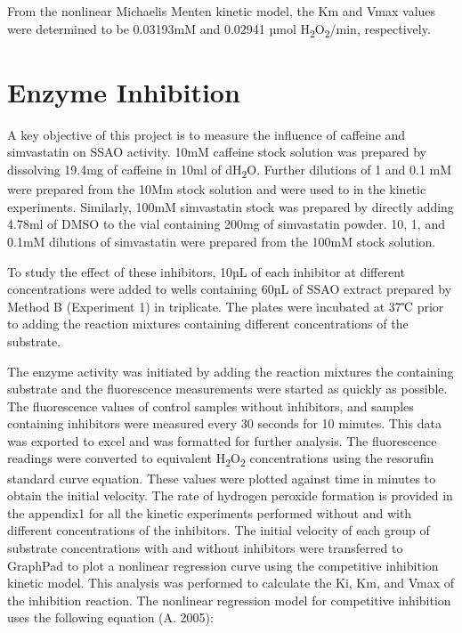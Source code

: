 \documentclass[
  letterpaper,
  DIV=11,
  numbers=noendperiod]{scrreprt}
\begin{document}
From the nonlinear Michaelis Menten kinetic model, the Km and Vmax
values were determined to be 0.03193mM and 0.02941 µmol
H\textsubscript{2}O\textsubscript{2}/min, respectively.

\section{\texorpdfstring{\textbf{Enzyme
Inhibition}}{Enzyme Inhibition}}\label{enzyme-inhibition}

A key objective of this project is to measure the influence of caffeine
and simvastatin on SSAO activity. 10mM caffeine stock solution was
prepared by dissolving 19.4mg of caffeine in 10ml of
dH\textsubscript{2}O. Further dilutions of 1 and 0.1 mM were prepared
from the 10Mm stock solution and were used to in the kinetic
experiments. Similarly, 100mM simvastatin stock was prepared by directly
adding 4.78ml of DMSO to the vial containing 200mg of simvastatin
powder. 10, 1, and 0.1mM dilutions of simvastatin were prepared from the
100mM stock solution.

To study the effect of these inhibitors, 10µL of each inhibitor at
different concentrations were added to wells containing 60µL of SSAO
extract prepared by Method B (Experiment 1) in triplicate. The plates
were incubated at 37℃ prior to adding the reaction mixtures containing
different concentrations of the substrate.

The enzyme activity was initiated by adding the reaction mixtures the
containing substrate and the fluorescence measurements were started as
quickly as possible. The fluorescence values of control samples without
inhibitors, and samples containing inhibitors were measured every 30
seconds for 10 minutes. This data was exported to excel and was
formatted for further analysis. The fluorescence readings were converted
to equivalent H\textsubscript{2}O\textsubscript{2} concentrations using
the resorufin standard curve equation. These values were plotted against
time in minutes to obtain the initial velocity. The rate of hydrogen
peroxide formation is provided in the appendix1 for all the kinetic
experiments performed without and with different concentrations of the
inhibitors. The initial velocity of each group of substrate
concentrations with and without inhibitors were transferred to GraphPad
to plot a nonlinear regression curve using the competitive inhibition
kinetic model. This analysis was performed to calculate the Ki, Km, and
Vmax of the inhibition reaction. The nonlinear regression model for
competitive inhibition uses the following equation (A. 2005):
\end{document}
